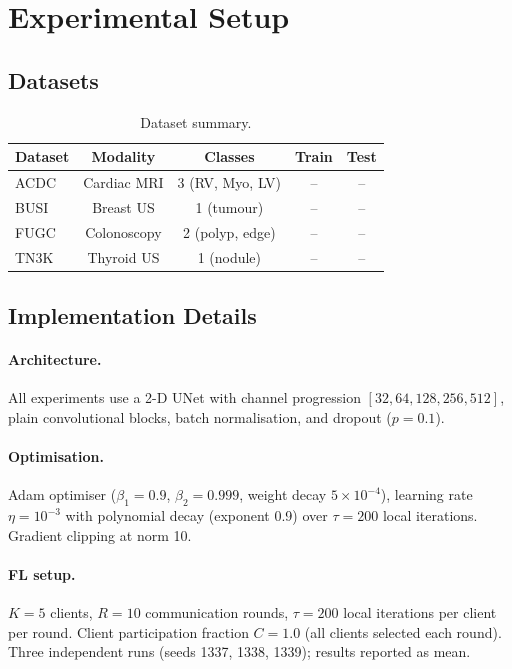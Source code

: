\section{Experimental Setup}
\label{sec:experiments}

\subsection{Datasets}

\begin{table}[t]
\centering
\caption{Dataset summary.}
\label{tab:datasets}
\begin{tabular}{lcccc}
\toprule
Dataset & Modality & Classes & Train & Test \\
\midrule
ACDC~\cite{bernard2018acdc}    & Cardiac MRI   & 3 (RV, Myo, LV) & -- & -- \\
BUSI~\cite{al2020busi}         & Breast US     & 1 (tumour)      & -- & -- \\
FUGC~\cite{fugc2025}           & Colonoscopy   & 2 (polyp, edge) & -- & -- \\
TN3K~\cite{gong2021tn3k}       & Thyroid US    & 1 (nodule)      & -- & -- \\
\bottomrule
\end{tabular}
\end{table}

\subsection{Implementation Details}

\paragraph{Architecture.}
All experiments use a 2-D UNet with channel progression
$[32, 64, 128, 256, 512]$, plain convolutional blocks, batch normalisation,
and dropout ($p=0.1$).

\paragraph{Optimisation.}
Adam optimiser ($\beta_1=0.9$, $\beta_2=0.999$, weight decay $5\times10^{-4}$),
learning rate $\eta=10^{-3}$ with polynomial decay (exponent 0.9) over
$\tau = 200$ local iterations.
Gradient clipping at norm 10.

\paragraph{FL setup.}
$K=5$ clients, $R=10$ communication rounds, $\tau=200$ local iterations per
client per round.
Client participation fraction $C=1.0$ (all clients selected each round).
Three independent runs (seeds 1337, 1338, 1339); results reported as mean.

